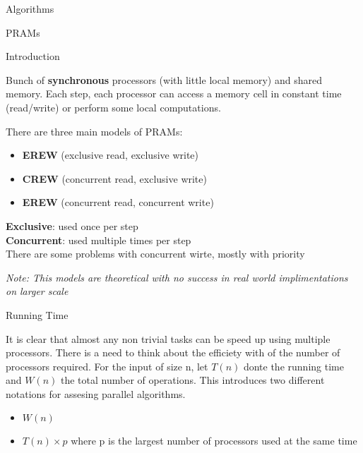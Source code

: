 \documentclass[12pt, letterpaper]{article}
\begin{document}
\begin{section}{Algorithms}

  \begin{subsection}{PRAMs}

    \begin{subsubsection}{Introduction}

      Bunch of \textbf{synchronous} processors (with little local memory) and
      shared memory. Each step, each processor can access a memory cell in
      constant time (read/write) or perform some local computations.

      There are three main models of PRAMs:
      \begin{itemize}
        \item \textbf{EREW} (exclusive read, exclusive write)
        \item \textbf{CREW} (concurrent read, exclusive write)
        \item \textbf{EREW} (concurrent read, concurrent write)
      \end{itemize}

      \textbf{Exclusive}: used once per step \\
      \textbf{Concurrent}: used multiple times per step \\
      There are some problems with concurrent wirte, mostly with priority

      \textit{Note: This models are theoretical with no success in real world
        implimentations on larger scale}

    \end{subsubsection}

    \begin{subsubsection}{Running Time}

      It is clear that almost any non trivial tasks can be speed up using
      multiple processors. There is a need to think about the efficiety with of
      the number of processors required. For the input of size n, let \(T(n)\)
      donte the running time and \(W(n)\) the total number of operations.
      This introduces two different notations for assesing parallel algorithms.
      \begin{itemize}
        \item \(W(n)\)
        \item \(T(n) \times p\) where p is the largest number of
              processors used at the same time
      \end{itemize}

    \end{subsubsection}

  \end{subsection}

\end{section}
\end{document}
